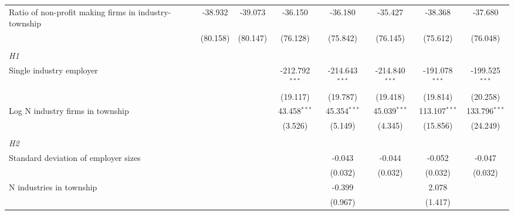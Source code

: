 \begin{tabular}{lcccccccc}
   Ratio of non-profit making firms in industry-township &                 & -38.932         & -39.073         & -36.150          & -36.180          & -35.427          & -38.368          & -37.680\\   
                                                         &                 & (80.158)        & (80.147)        & (76.128)         & (75.842)         & (76.145)         & (75.612)         & (76.048)\\   
\hdashline %
\\[0.1ex] %
\emph{H1} \\ 
   Single industry employer                              &                 &                 &                 & -212.792$^{***}$ & -214.643$^{***}$ & -214.840$^{***}$ & -191.078$^{***}$ & -199.525$^{***}$\\   
                                                         &                 &                 &                 & (19.117)         & (19.787)         & (19.418)         & (19.814)         & (20.258)\\   
   Log N industry firms in township                      &                 &                 &                 & 43.458$^{***}$   & 45.354$^{***}$   & 45.039$^{***}$   & 113.107$^{***}$  & 133.796$^{***}$\\   
                                                         &                 &                 &                 & (3.526)          & (5.149)          & (4.345)          & (15.856)         & (24.249)\\   
\hdashline %
\\[0.1ex] %
\emph{H2} \\ 
   Standard deviation of employer sizes                  &                 &                 &                 &                  & -0.043           & -0.044           & -0.052           & -0.047\\   
                                                         &                 &                 &                 &                  & (0.032)          & (0.032)          & (0.032)          & (0.032)\\   
   N industries in township                              &                 &                 &                 &                  & -0.399           &                  & 2.078            &   \\   
                                                         &                 &                 &                 &                  & (0.967)          &                  & (1.417)          &   \\   

\end{tabular}
